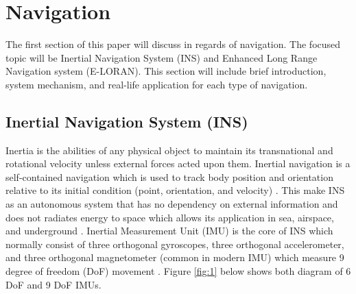 \newpage
\setcounter{page}{1}
\justifying
\noindent

\section{Navigation}
The first section of this paper will discuss in regards of navigation. The focused topic will be Inertial Navigation System (INS) and Enhanced Long Range Navigation system (E-LORAN). This section will include brief introduction, system mechanism, and real-life application for each type of navigation.

\subsection{Inertial Navigation System (INS)}
Inertia is the abilities of any physical object to maintain its transnational and rotational velocity unless external forces acted upon them. Inertial navigation  is a self-contained navigation which is used to track body position and orientation relative to its initial condition (point, orientation, and velocity) \cite{Woodman2007NumberNavigation} \cite{Ribbens2003AircraftInstruments}. This make INS as an autonomous system that  has no dependency on external information and does not radiates energy to space which allows its application in sea, airspace, and underground \cite{2018MiniatureUnit}. Inertial Measurement Unit (IMU) is the core of INS which normally consist of three orthogonal gyroscopes, three orthogonal accelerometer, and three orthogonal magnetometer (common in modern IMU) which measure 9 degree of freedom (DoF) movement \cite{Christ2014NavigationalSensors}. Figure \ref{fig:1} below shows both diagram of 6 DoF and 9 DoF IMUs.

